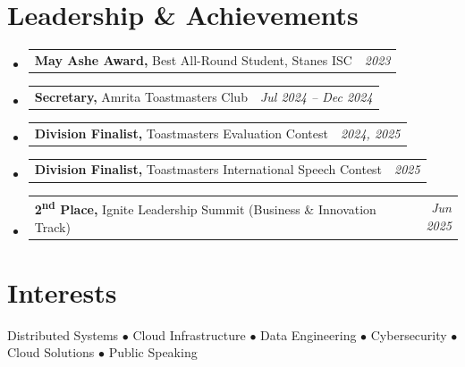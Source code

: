 \documentclass[a4paper,11pt]{article}
\makeatletter
\newcommand{\resumePOR}[3]{
\vspace{0.5mm}\item[]
    \begin{tabular*}{0.97\textwidth}[t]{l@{\extracolsep{\fill}}r}
        \textbf{#1}\hspace{0.3mm}#2 & \textit{\small{#3}} 
    \end{tabular*}
    \vspace{-2mm}
}
\newcommand{\resumeSubHeadingListStart}{\begin{itemize}[leftmargin=*,labelsep=0mm]}
\newcommand{\resumeSubHeadingListEnd}{\end{itemize}\vspace{2mm}}
\makeatother
\begin{document}
\section{\textbf{Leadership \& Achievements}}
\vspace{-0.4mm}
\resumeSubHeadingListStart
\resumePOR{May Ashe Award, } %
    {Best All-Round Student, Stanes ISC} %
    {2023} %
\resumePOR{Secretary, } %
    {Amrita Toastmasters Club} %
    {Jul 2024 – Dec 2024} %
\resumePOR{Division Finalist, } %
    {Toastmasters Evaluation Contest} %
    {2024, 2025} %
\resumePOR{Division Finalist, } %
    {Toastmasters International Speech Contest} %
    {2025} %
\resumePOR{2\textsuperscript{nd} Place, } %
    {Ignite Leadership Summit (Business \& Innovation Track)} %
    {Jun 2025} %
\resumeSubHeadingListEnd
\vspace{-2mm}

\section{\textbf{Interests}}
\vspace{1mm}
\small{Distributed Systems \hspace{3pt}$\bullet$\hspace{3pt} Cloud Infrastructure \hspace{3pt}$\bullet$\hspace{3pt} Data Engineering \hspace{3pt}$\bullet$\hspace{3pt} Cybersecurity \hspace{3pt}$\bullet$\hspace{3pt} Cloud Solutions \hspace{3pt}$\bullet$\hspace{3pt} Public Speaking}
\vspace{-2mm}

\end{document}
